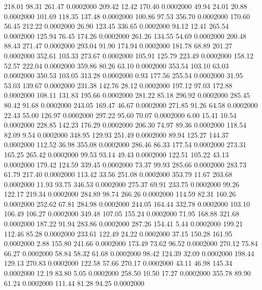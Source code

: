  218.01   98.31  261.47   0.0002000
 209.42   12.42  170.40   0.0002000
  49.94   24.01   20.88   0.0002000
 101.69  118.35  137.48   0.0002000
 100.86   97.53  356.70   0.0002000
 170.60   56.45  212.22   0.0002000
  26.90  123.45  336.65   0.0002000
  94.12   12.41  265.54   0.0002000
 125.94   76.45  174.26   0.0002000
 261.26  134.55   54.69   0.0002000
 200.48   88.43  271.47   0.0002000
 293.04   91.90  174.94   0.0002000
 181.78   68.89  201.27   0.0002000
 352.61  103.33  273.67   0.0002000
 105.91  125.79  223.49   0.0002000
 158.12   52.57  222.04   0.0002000
 359.86   80.26   63.10   0.0002000
 353.54  103.10   63.03   0.0002000
 350.53  103.05  313.28   0.0002000
   0.93  177.56  255.54   0.0002000
  31.95   53.03  139.67   0.0002000
 231.38  142.76   28.12   0.0002000
 197.12   97.03  172.88   0.0002000
 108.11  131.83  195.66   0.0002000
 281.22   85.18  296.92   0.0002000
 285.45   80.42   91.68   0.0002000
 243.05  169.47   46.67   0.0002000
 271.85   91.26   64.58   0.0002000
  22.43   55.00  126.97   0.0002000
 297.22   95.60   70.07   0.0002000
   6.00   15.41   10.54   0.0002000
 228.85  142.23  176.29   0.0002000
 206.30   74.97   89.36   0.0002000
 118.54   82.09    9.54   0.0002000
 348.95  129.93  251.49   0.0002000
  89.94  125.27  144.37   0.0002000
 112.52   36.98  355.08   0.0002000
 286.46   86.33  177.54   0.0002000
 273.31  165.25  265.42   0.0002000
  99.53   93.14   49.43   0.0002000
 122.51  105.22   43.13   0.0002000
 179.42  124.59  339.45   0.0002000
  73.37   99.93  285.66   0.0002000
 283.73   61.79  217.40   0.0002000
 113.42   33.56  251.08   0.0002000
 353.79   11.67  203.68   0.0002000
  11.93   93.75  346.53   0.0002000
 275.37   69.91  233.75   0.0002000
  99.26  122.17  219.34   0.0002000
 284.89   98.74  266.26   0.0002000
 114.59   82.31  160.26   0.0002000
 252.62   67.81  284.98   0.0002000
 244.05  164.44  332.78   0.0002000
 103.10  106.49  106.27   0.0002000
 349.48  107.05  155.24   0.0002000
  71.95  168.88  321.68   0.0002000
 187.22   91.94  283.86   0.0002000
 287.26  154.41    5.44   0.0002000
 199.21  112.46   85.28   0.0002000
 233.61  122.49   24.22   0.0002000
  37.15  150.28  161.95   0.0002000
   2.88  155.80  241.66   0.0002000
 173.49   73.62   96.52   0.0002000
 270.12   75.84   66.27   0.0002000
  58.84   58.32   61.68   0.0002000
  98.42  124.39   32.09   0.0002000
 198.44  129.13  270.83   0.0002000
 122.58   57.66  270.17   0.0002000
  43.11   46.98  145.34   0.0002000
  12.19   83.80    5.05   0.0002000
 258.50   10.50   17.27   0.0002000
 355.78   89.90   61.24   0.0002000
 111.44   81.28   94.25   0.0002000
